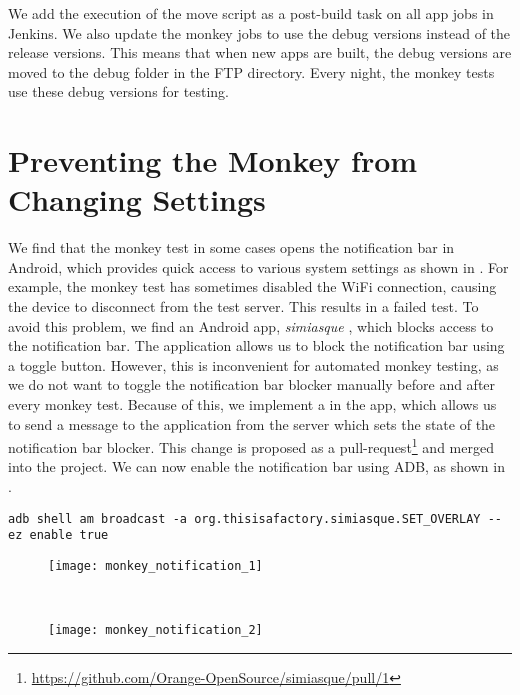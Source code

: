 We add the execution of the move script as a post-build task on all app jobs in Jenkins. We also update the monkey jobs to use the debug versions instead of the release versions. This means that when new apps are built, the debug versions are moved to the debug folder in the FTP directory. Every night, the monkey tests use these debug versions for testing.

\section{Preventing the Monkey from Changing Settings}\label{sec:monkey_simiasque}
We find that the monkey test in some cases opens the notification bar in Android, which provides quick access to various system settings as shown in . For example, the monkey test has sometimes disabled the WiFi connection, causing the device to disconnect from the test server. This results in a failed test. To avoid this problem, we find an Android app, \emph{simiasque} \parencite{simiasque-app}, which blocks access to the notification bar. The application allows us to block the notification bar using a toggle button. However, this is inconvenient for automated monkey testing, as we do not want to toggle the notification bar blocker manually before and after every monkey test. Because of this, we implement a  in the app, which allows us to send a message to the application from the server which sets the state of the notification bar blocker. This change is proposed as a pull-request\footnote{\url{https://github.com/Orange-OpenSource/simiasque/pull/1}} and merged into the project. We can now enable the notification bar using ADB, as shown in .
\begin{lstlisting}[float=tbp,label=lst:adb-simiasque-broadcast,caption=Command for enabling the notification bar blocker]
adb shell am broadcast -a org.thisisafactory.simiasque.SET_OVERLAY --ez enable true
\end{lstlisting}

\begin{figure}
\centering
\begin{minipage}{.47\textwidth}
  \centering
  \texttt{[image: monkey\_notification\_1]}
  \label{fig:android_notification_settings}
\end{minipage}
~~~~
\begin{minipage}{.47\textwidth}
  \centering
  \texttt{[image: monkey\_notification\_2]}
  \label{fig:android_notification_blocker}
\end{minipage}
\end{figure}

